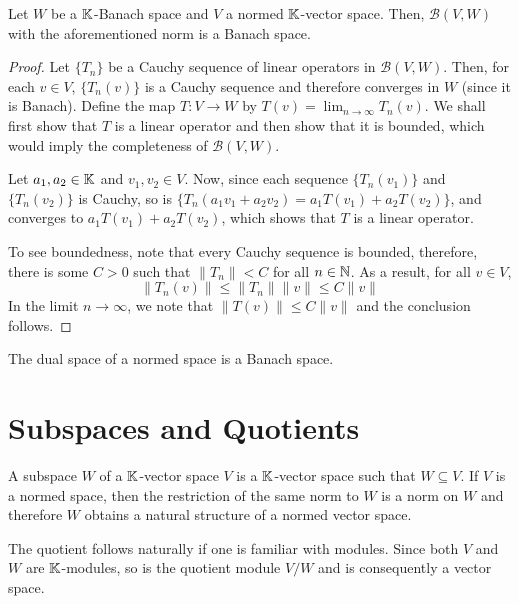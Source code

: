 \begin{theorem}
    Let $W$ be a $\mathbb K$-Banach space and $V$ a normed $\mathbb K$-vector space. Then, $\mathcal B(V,W)$ with the aforementioned norm is a Banach space.
\end{theorem}
\begin{proof}
    Let $\{T_n\}$ be a Cauchy sequence of linear operators in $\mathcal B(V,W)$. Then, for each $v\in V$, $\{T_n(v)\}$ is a Cauchy sequence and therefore converges in $W$ (since it is Banach). Define the map $T: V\to W$ by $T(v) = \lim_{n\to\infty} T_n(v)$. We shall first show that $T$ is a linear operator and then show that it is bounded, which would imply the completeness of $\mathcal B(V,W)$.

    Let $a_1,a_2\in\mathbb K$ and $v_1,v_2\in V$. Now, since each sequence $\{T_n(v_1)\}$ and $\{T_n(v_2)\}$ is Cauchy, so is $\{T_n(a_1v_1 + a_2v_2) = a_1T(v_1) + a_2T(v_2)\}$, and converges to $a_1T(v_1) + a_2T(v_2)$, which shows that $T$ is a linear operator.

    To see boundedness, note that every Cauchy sequence is bounded, therefore, there is some $C > 0$ such that $\|T_n\| < C$ for all $n\in\mathbb{N}$. As a result, for all $v\in V$, 
    \begin{equation*}
        \|T_n(v)\|\le\|T_n\|\|v\|\le C\|v\|
    \end{equation*}
    In the limit $n\to\infty$, we note that $\|T(v)\|\le C\|v\|$ and the conclusion follows.
\end{proof}
\begin{corollary}
    The dual space of a normed space is a Banach space.
\end{corollary}

\section{Subspaces and Quotients}

\begin{definition}[Subspaces]
    A subspace $W$ of a $\mathbb K$-vector space $V$ is a $\mathbb K$-vector space such that $W\subseteq V$. If $V$ is a normed space, then the restriction of the same norm to $W$ is a norm on $W$ and therefore $W$ obtains a natural structure of a normed vector space.
\end{definition}

The quotient follows naturally if one is familiar with modules. Since both $V$ and $W$ are $\mathbb K$-modules, so is the quotient module $V/W$ and is consequently a vector space.

